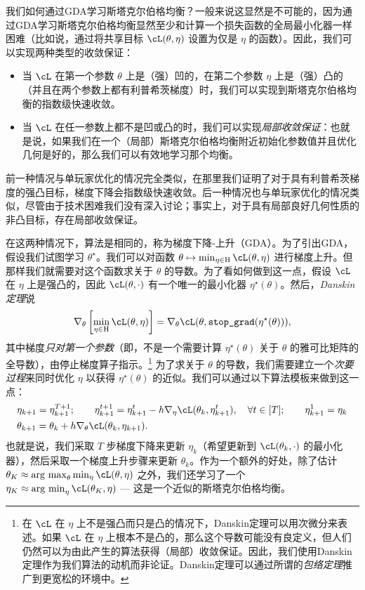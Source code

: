 \documentclass[../../book-main.tex]{subfiles}
\begin{document}
我们如何通过GDA学习斯塔克尔伯格均衡？一般来说这显然是不可能的，因为通过GDA学习斯塔克尔伯格均衡显然至少和计算一个损失函数的全局最小化器一样困难（比如说，通过将共享目标 \(\cL(\theta, \eta)\) 设置为仅是 \(\eta\) 的函数）。因此，我们可以实现两种类型的收敛保证：
\begin{itemize}
    \item 当 \(\cL\) 在第一个参数 \(\theta\) 上是（强）凹的，在第二个参数 \(\eta\) 上是（强）凸的（并且在两个参数上都有利普希茨梯度）时，我们可以实现到斯塔克尔伯格均衡的指数级快速收敛。
    \item 当 \(\cL\) 在任一参数上都不是凹或凸的时，我们可以实现\textit{局部收敛保证}：也就是说，如果我们在一个（局部）斯塔克尔伯格均衡附近初始化参数值并且优化几何是好的，那么我们可以有效地学习那个均衡。
\end{itemize}

前一种情况与单玩家优化的情况完全类似，在那里我们证明了对于具有利普希茨梯度的强凸目标，梯度下降会指数级快速收敛。后一种情况也与单玩家优化的情况类似，尽管由于技术困难我们没有深入讨论；事实上，对于具有局部良好几何性质的非凸目标，存在局部收敛保证。

在这两种情况下，算法是相同的，称为梯度下降-上升（GDA）。为了引出GDA，假设我们试图学习 \(\theta^{\star}\)。我们可以对函数 \(\theta \mapsto \min_{\eta \in \Eta}\cL(\theta, \eta)\) 进行梯度上升。但那样我们就需要对这个函数求关于 \(\theta\) 的导数。为了看如何做到这一点，假设 \(\cL\) 在 \(\eta\) 上是强凸的，因此 \(\cL(\theta, \cdot)\) 有一个唯一的最小化器 \(\eta^{\star}(\theta)\)。然后，\textit{Danskin定理}说
\begin{equation}
    \nabla_{\theta}\bs{\min_{\eta \in \Eta}\cL(\theta, \eta)} = \nabla_{\theta}\cL(\theta, \texttt{stop\_grad}(\eta^{\star}(\theta))),
\end{equation}
其中梯度\textit{只对第一个参数}（即，不是一个需要计算 \(\eta^{\star}(\theta)\) 关于 \(\theta\) 的雅可比矩阵的全导数），由停止梯度算子指示。\footnote{在 \(\cL\) 在 \(\eta\) 上不是强凸而只是凸的情况下，Danskin定理可以用次微分来表述。如果 \(\cL\) 在 \(\eta\) 上根本不是凸的，那么这个导数可能没有良定义，但人们仍然可以为由此产生的算法获得（局部）收敛保证。因此，我们使用Danskin定理作为我们算法的动机而非论证。Danskin定理可以通过所谓的\textit{包络定理}推广到更宽松的环境中。}
为了求关于 \(\theta\) 的导数，我们需要建立一个\textit{次要过程}来同时优化 \(\eta\) 以获得 \(\eta^{\star}(\theta)\) 的近似。我们可以通过以下算法模板来做到这一点：
\begin{align}
    &\eta_{k + 1} = \eta_{k + 1}^{T + 1}; \qquad \eta_{k + 1}^{t + 1} = \eta_{k + 1}^{t} - h \nabla_{\eta} \cL(\theta_{k}, \eta_{k + 1}^{t}), \quad \forall t \in [T]; \qquad \eta_{k + 1}^{1} = \eta_{k} \\
    &\theta_{k + 1} = \theta_{k} + h \nabla_{\theta}\cL(\theta_{k}, \eta_{k + 1}).
\end{align}
也就是说，我们采取 \(T\) 步梯度下降来更新 \(\eta_{k}\)（希望更新到 \(\cL(\theta_{k}, \cdot)\) 的最小化器），然后采取一个梯度上升步骤来更新 \(\theta_{k}\)。作为一个额外的好处，除了估计 \(\theta_{K} \approx \argmax_{\theta}\min_{\eta}\cL(\theta, \eta)\) 之外，我们还学习了一个 \(\eta_{K} \approx \argmin_{\eta}\cL(\theta_{K}, \eta)\) --- 这是一个近似的斯塔克尔伯格均衡。
\end{document}
